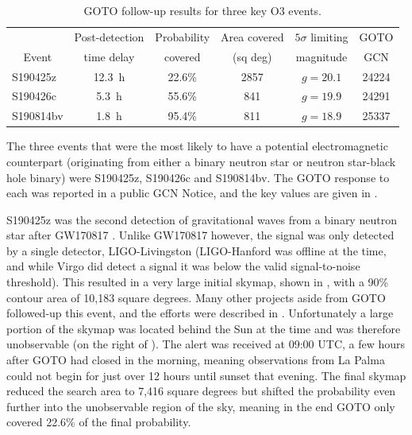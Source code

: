 \begin{colsection}
\begin{table}[t]    \begin{center}
        \begin{tabular}{l|ccccc} %
                                       & Post-detection   & Probability &  Area covered & $5\sigma$ limiting & GOTO \\
            \multicolumn{1}{c|}{Event} & time delay       & covered     & (sq deg)      & magnitude          & GCN \\
            \midrule
                             S190425z  & \SI{12.3}{\hour} & 22.6\%      & 2857          & $g=20.1$           & 24224 \tablefootnote{~~\citet{S190425z_GOTO}} \\
                             S190426c  &  \SI{5.3}{\hour} & 55.6\%      &  841          & $g=19.9$           & 24291 \tablefootnote{~~\citet{S190426c_GOTO}} \\
                             S190814bv &  \SI{1.8}{\hour} & 95.4\%      &  811          & $g=18.9$           & 25337 \tablefootnote{~~\citet{S190814bv_GOTO}} \\
        \end{tabular}
    \end{center}
    \caption[GOTO follow-up results for three key O3 events]{
        GOTO follow-up results for three key O3 events.
    }\label{tab:events_3key}
\end{table}

The three events that were the most likely to have a potential electromagnetic counterpart (originating from either a binary neutron star or neutron star-black hole binary) were S190425z, S190426c and S190814bv. The GOTO response to each was reported in a public GCN Notice, and the key values are given in .

S190425z was the second detection of gravitational waves from a binary neutron star after GW170817 \citep{S190425z}. Unlike GW170817 however, the signal was only detected by a single detector, LIGO-Livingston (LIGO-Hanford was offline at the time, and while Virgo did detect a signal it was below the valid signal-to-noise threshold). This resulted in a very large initial skymap, shown in , with a 90\% contour area of 10,183 square degrees. Many other projects aside from GOTO followed-up this event, and the  efforts were described in . Unfortunately a large portion of the skymap was located behind the Sun at the time and was therefore unobservable (on the right of ). The alert was received at 09:00 UTC, a few hours after GOTO had closed in the morning, meaning observations from La Palma could not begin for just over 12 hours until sunset that evening. The final skymap reduced the search area to 7,416 square degrees but shifted the probability even further into the unobservable region of the sky, meaning in the end GOTO only covered 22.6\% of the final probability.


\end{colsection}
